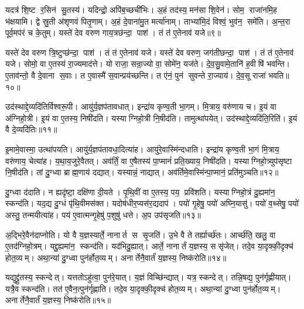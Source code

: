 यदत्र॑ शि॒ष्ट र॒सिन॑ सु॒तस्य॑। यदिन्द्रो॒ अपि॑ब॒च्छची॑भिः। अ॒हं तद॑स्य॒ मन॑सा शि॒वेन॑। सोम॒ राजा॑नमि॒ह भ॑क्षयामि। द्वे स्रु॒ती अ॑शृणवं पितृ॒णाम्। अ॒हं दे॒वाना॑मु॒त मर्त्या॑नाम्। ताभ्या॑मि॒दं विश्वं॒ भुव॑न॒ समे॑ति। अ॒न्त॒रा पूर्व॒मप॑रं च के॒तुम्। यस्ते॑ देव वरुण गाय॒त्रछ॑न्दा॒ पाश॑। तं त॑ ए॒तेनाव॑ यजे॥९॥

यस्ते॑ देव वरुण त्रि॒ष्टुप्छ॑न्दा॒ पाश॑। तं त॑ ए॒तेनाव॑ यजे। यस्ते॑ देव वरुण॒ जग॑तीछन्दा॒ पाश॑। तं त॑ ए॒तेनाव॑ यजे। सोमो॒ वा ए॒तस्य॑ रा॒ज्यमाद॑त्ते। यो राजा॒ सन्रा॒ज्यो वा॒ सोमे॑न॒ यज॑ते। दे॒व॒सु॒वामे॒तानि॑ ह॒वीषि॑ भवन्ति। ए॒ताव॑न्तो॒ वै दे॒वाना स॒वाः। त ए॒वास्मै॑ स॒वान्प्रय॑च्छन्ति। त ए॑नं॒ पुन॑ सुवन्ते रा॒ज्याय॑। दे॒व॒सू राजा॑ भवति॥१०॥\anuvakamend[सोम॑ आवि॒शन् य॑जे रा॒ज्यायैकं॑ च]

उद॑स्थाद्दे॒व्यदि॑तिर्विश्वरू॒पी। आयु॑र्य॒ज्ञप॑तावधात्। इन्द्रा॑य कृण्व॒ती भा॒गम्। मि॒त्राय॒ वरु॑णाय च। इ॒यं वा अ॑ग्निहो॒त्री। इ॒यं वा ए॒तस्य॒ निषी॑दति। यस्याग्निहो॒त्री नि॒षीद॑ति। तामुत्था॑पयेत्। उद॑स्थाद्दे॒व्यदि॑ति॒रिति॑। इ॒यं वै दे॒व्यदि॑तिः॥११॥

इ॒मामे॒वास्मा॒ उत्था॑पयति। आयु॑र्य॒ज्ञप॑तावधा॒दित्या॑ह। आयु॑रे॒वास्मि॑न्दधाति। इन्द्रा॑य कृण्व॒ती भा॒गं मि॒त्राय॒ वरु॑णाय॒ चेत्या॑ह। य॒था॒य॒जुरे॒वैतत्। अव॑र्तिं॒ वा ए॒षैतस्य॑ पा॒प्मानं॑ प्रति॒ख्याय॒ निषी॑दति। यस्याग्निहो॒त्र्युप॑सृष्टा नि॒षीद॑ति। तां दु॒ग्ध्वा ब्राह्म॒णाय॑ दद्यात्। यस्यान्नं॒ नाद्यात्। अव॑र्तिमे॒वास्मि॑न्पा॒प्मानं॒ प्रति॑मुञ्चति॥१२॥

दु॒ग्ध्वा द॑दाति। न ह्यदृ॑ष्टा॒ दक्षि॑णा दी॒यते। पृ॒थि॒वीं वा ए॒तस्य॒ पय॒ प्रवि॑शति। यस्याग्निहो॒त्रं दु॒ह्यमा॑न॒ स्कन्द॑ति। यद॒द्य दु॒ग्धं पृ॑थि॒वीमस॑क्त। यदोष॑धीर॒प्यस॑र॒द्यदाप॑। पयो॑ गृ॒हेषु॒ पयो॑ अघ्नि॒यासु॑। पयो॑ व॒थ्सेषु॒ पयो॑ अस्तु॒ तन्मयीत्या॑ह। पय॑ ए॒वात्मन्गृ॒हेषु॑ प॒शुषु॑ धत्ते। अ॒प उप॑सृजति॥१३॥

अ॒द्भिरे॒वैन॑दाप्नोति। यो वै य॒ज्ञस्यार्ते॒ नानार्त स सृ॒जति॑। उ॒भे वै ते तर्ह्यार्च्छ॑तः। आर्च्छ॑ति॒ खलु॒ वा ए॒तद॑ग्निहो॒त्रम्। यद्दु॒ह्यमा॑न॒ स्कन्द॑ति। यद॑भिदु॒ह्यात्। आर्ते॒ नानार्तं य॒ज्ञस्य॒ ससृ॑जेत्। तदे॒व या॒दृक्की॒दृक्च॑ होत॒व्यम्। अथा॒न्यां दु॒ग्ध्वा पुन॑र्\mbox{}होत॒व्यम्। अनार्तेनै॒वार्तं॑ य॒ज्ञस्य॒ निष्क॑रोति॥१४॥

यद्युद्द्रु॑तस्य॒ स्कन्देत्। यत्ततोऽहु॑त्वा॒ पुन॑रे॒यात्। य॒ज्ञं विच्छि॑न्द्यात्। यत्र॒ स्कन्देत्। तन्नि॒षद्य॒ पुन॑र्गृह्णीयात्। यत्रै॒व स्कन्द॑ति। तत॑ ए॒वैन॒त्पुन॑र्गृह्णाति। तदे॒व या॒दृक्की॒दृक्च॑ होत॒व्यम्। अथा॒न्यां दु॒ग्ध्वा पुन॑र्\mbox{}होत॒व्यम्। अनार्तेनै॒वार्तं॑ य॒ज्ञस्य॒ निष्क॑रोति॥१५॥

